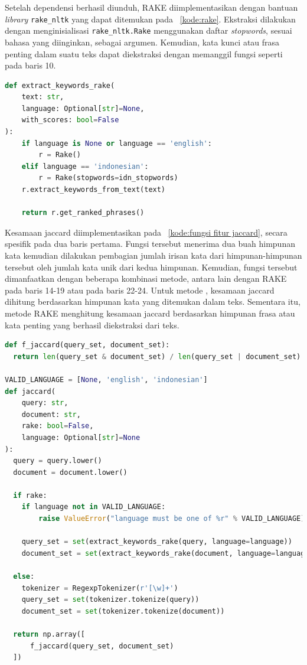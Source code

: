 Setelah dependensi berhasil diunduh, RAKE diimplementasikan dengan bantuan \textit{library} \lstinline{rake_nltk} yang dapat ditemukan pada \kode{}~\ref{kode:rake}. Ekstraksi dilakukan dengan menginisialisasi \lstinline{rake_nltk.Rake} menggunakan daftar \textit{stopwords}, sesuai bahasa yang diinginkan, sebagai argumen. Kemudian, kata kunci atau frasa penting dalam suatu teks dapat diekstraksi dengan memanggil fungsi seperti pada baris 10.
\begin{lstlisting}[language=Python, caption={Implementasi RAKE}, label={kode:rake}]
def extract_keywords_rake(
    text: str,
    language: Optional[str]=None,
    with_scores: bool=False
):
    if language is None or language == 'english':
        r = Rake()
    elif language == 'indonesian':
        r = Rake(stopwords=idn_stopwords)
    r.extract_keywords_from_text(text)
    
    return r.get_ranked_phrases()
\end{lstlisting}

Kesamaan jaccard diimplementasikan pada \kode{}~\ref{kode:fungsi fitur jaccard}, secara spesifik pada dua baris pertama. Fungsi tersebut menerima dua buah himpunan kata kemudian dilakukan pembagian jumlah irisan kata dari himpunan-himpunan tersebut oleh jumlah kata unik dari kedua himpunan. Kemudian, fungsi tersebut dimanfaatkan dengan beberapa kombinasi metode, antara lain dengan RAKE pada baris 14-19 atau \regex{} pada baris 22-24. 
Untuk metode \regex{}, kesamaan jaccard dihitung berdasarkan himpunan kata yang ditemukan dalam teks. Sementara itu, metode RAKE menghitung kesamaan jaccard berdasarkan himpunan frasa atau kata penting yang berhasil diekstraksi dari teks.
\begin{lstlisting}[language=Python, caption={Fungsi fitur jaccard}, label={kode:fungsi fitur jaccard}]
def f_jaccard(query_set, document_set):
  return len(query_set & document_set) / len(query_set | document_set)

VALID_LANGUAGE = [None, 'english', 'indonesian']
def jaccard(
    query: str,
    document: str,
    rake: bool=False,
    language: Optional[str]=None
):
  query = query.lower()
  document = document.lower()

  if rake:
    if language not in VALID_LANGUAGE:
        raise ValueError("language must be one of %r" % VALID_LANGUAGE)

    query_set = set(extract_keywords_rake(query, language=language))
    document_set = set(extract_keywords_rake(document, language=language))

  else:
    tokenizer = RegexpTokenizer(r'[\w]+')
    query_set = set(tokenizer.tokenize(query))
    document_set = set(tokenizer.tokenize(document))

  return np.array([
      f_jaccard(query_set, document_set)
  ])
\end{lstlisting}



